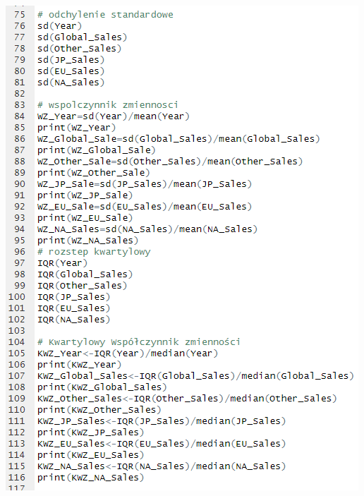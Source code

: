 \documentclass[12pt]{article}
\begin{document}
	\includegraphics[scale=0.6]{Zad1B}
	
	\newpage
\end{document}
